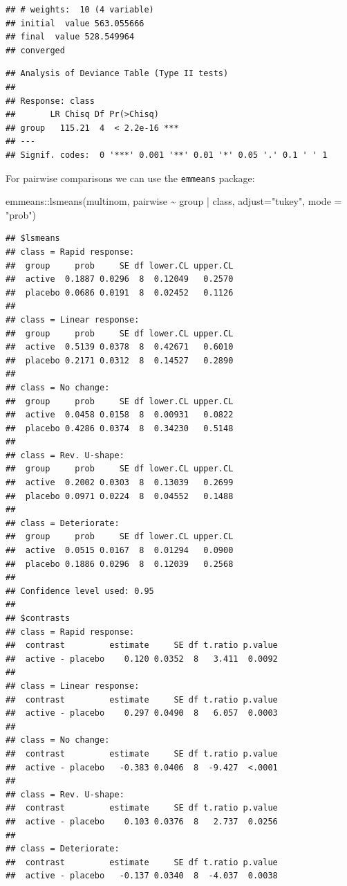 \documentclass[
]{book}
\newenvironment{Shaded}{\begin{snugshade}}{\end{snugshade}}
\newcommand{\AttributeTok}[1]{\textcolor[rgb]{0.77,0.63,0.00}{#1}}
\newcommand{\FunctionTok}[1]{\textcolor[rgb]{0.00,0.00,0.00}{#1}}
\newcommand{\NormalTok}[1]{#1}
\newcommand{\SpecialCharTok}[1]{\textcolor[rgb]{0.00,0.00,0.00}{#1}}
\newcommand{\StringTok}[1]{\textcolor[rgb]{0.31,0.60,0.02}{#1}}
\begin{document}
\begin{verbatim}
## # weights:  10 (4 variable)
## initial  value 563.055666 
## final  value 528.549964 
## converged
\end{verbatim}

\begin{verbatim}
## Analysis of Deviance Table (Type II tests)
## 
## Response: class
##       LR Chisq Df Pr(>Chisq)    
## group   115.21  4  < 2.2e-16 ***
## ---
## Signif. codes:  0 '***' 0.001 '**' 0.01 '*' 0.05 '.' 0.1 ' ' 1
\end{verbatim}

For pairwise comparisons we can use the \texttt{emmeans} package:

\begin{Shaded}
\begin{Highlighting}[]
\NormalTok{emmeans}\SpecialCharTok{::}\FunctionTok{lsmeans}\NormalTok{(multinom, pairwise }\SpecialCharTok{\textasciitilde{}}\NormalTok{ group }\SpecialCharTok{|}\NormalTok{ class, }\AttributeTok{adjust=}\StringTok{"tukey"}\NormalTok{, }\AttributeTok{mode =} \StringTok{"prob"}\NormalTok{)}
\end{Highlighting}
\end{Shaded}

\begin{verbatim}
## $lsmeans
## class = Rapid response:
##  group     prob     SE df lower.CL upper.CL
##  active  0.1887 0.0296  8  0.12049   0.2570
##  placebo 0.0686 0.0191  8  0.02452   0.1126
## 
## class = Linear response:
##  group     prob     SE df lower.CL upper.CL
##  active  0.5139 0.0378  8  0.42671   0.6010
##  placebo 0.2171 0.0312  8  0.14527   0.2890
## 
## class = No change:
##  group     prob     SE df lower.CL upper.CL
##  active  0.0458 0.0158  8  0.00931   0.0822
##  placebo 0.4286 0.0374  8  0.34230   0.5148
## 
## class = Rev. U-shape:
##  group     prob     SE df lower.CL upper.CL
##  active  0.2002 0.0303  8  0.13039   0.2699
##  placebo 0.0971 0.0224  8  0.04552   0.1488
## 
## class = Deteriorate:
##  group     prob     SE df lower.CL upper.CL
##  active  0.0515 0.0167  8  0.01294   0.0900
##  placebo 0.1886 0.0296  8  0.12039   0.2568
## 
## Confidence level used: 0.95 
## 
## $contrasts
## class = Rapid response:
##  contrast         estimate     SE df t.ratio p.value
##  active - placebo    0.120 0.0352  8   3.411  0.0092
## 
## class = Linear response:
##  contrast         estimate     SE df t.ratio p.value
##  active - placebo    0.297 0.0490  8   6.057  0.0003
## 
## class = No change:
##  contrast         estimate     SE df t.ratio p.value
##  active - placebo   -0.383 0.0406  8  -9.427  <.0001
## 
## class = Rev. U-shape:
##  contrast         estimate     SE df t.ratio p.value
##  active - placebo    0.103 0.0376  8   2.737  0.0256
## 
## class = Deteriorate:
##  contrast         estimate     SE df t.ratio p.value
##  active - placebo   -0.137 0.0340  8  -4.037  0.0038
\end{verbatim}
\end{document}
